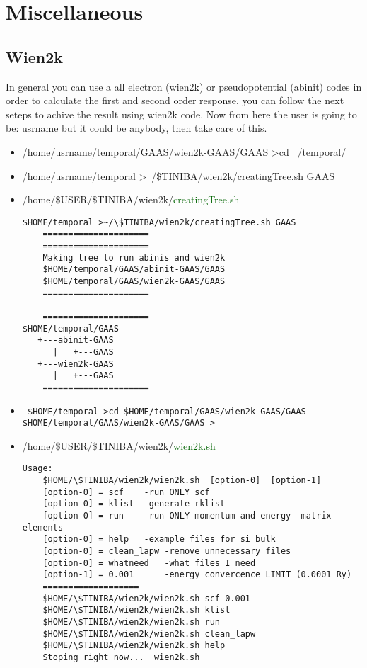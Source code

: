 \chapter{Miscellaneous}

\section{Wien2k}
In general you can use a all electron (wien2k) or pseudopotential 
(abinit) codes in order to calculate 
the first and second order response, you can follow the next seteps to 
achive the result using wien2k code. 
Now from here the user is going to be: usrname but it could be anybody, then 
take care of this. 
\begin{itemize}
\item /home/usrname/temporal/GAAS/wien2k-GAAS/GAAS >cd ~/temporal/
\item /home/usrname/temporal >~/\$TINIBA/wien2k/creatingTree.sh GAAS
\item /home/\$USER/\$TINIBA/wien2k/\textcolor{darkgreen}{creatingTree.sh} 
\begin{verbatim}
$HOME/temporal >~/\$TINIBA/wien2k/creatingTree.sh GAAS
    =====================
    =====================
    Making tree to run abinis and wien2k 
    $HOME/temporal/GAAS/abinit-GAAS/GAAS
    $HOME/temporal/GAAS/wien2k-GAAS/GAAS
    =====================

    =====================
$HOME/temporal/GAAS
   +---abinit-GAAS
      |   +---GAAS
   +---wien2k-GAAS
      |   +---GAAS
    =====================
\end{verbatim}

\item 
 \begin{verbatim}
 $HOME/temporal >cd $HOME/temporal/GAAS/wien2k-GAAS/GAAS
$HOME/temporal/GAAS/wien2k-GAAS/GAAS >
 \end{verbatim}
\item /home/\$USER/\$TINIBA/wien2k/\textcolor{darkgreen}{wien2k.sh} 
\begin{verbatim}
Usage: 
    $HOME/\$TINIBA/wien2k/wien2k.sh  [option-0]  [option-1] 
    [option-0] = scf    -run ONLY scf 
    [option-0] = klist  -generate rklist
    [option-0] = run    -run ONLY momentum and energy  matrix elements 
    [option-0] = help   -example files for si bulk 
    [option-0] = clean_lapw -remove unnecessary files 
    [option-0] = whatneed   -what files I need  
    [option-1] = 0.001      -energy convercence LIMIT (0.0001 Ry)
    ===================
    $HOME/\$TINIBA/wien2k/wien2k.sh scf 0.001
    $HOME/\$TINIBA/wien2k/wien2k.sh klist
    $HOME/\$TINIBA/wien2k/wien2k.sh run 
    $HOME/\$TINIBA/wien2k/wien2k.sh clean_lapw
    $HOME/\$TINIBA/wien2k/wien2k.sh help
    Stoping right now...  wien2k.sh
\end{verbatim}



 
\end{itemize}
